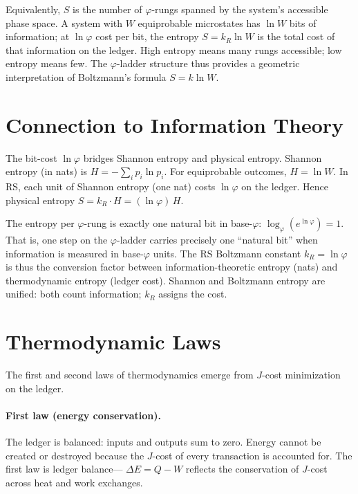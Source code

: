 \documentclass[12pt,a4paper]{article}
\theoremstyle{definition}
\theoremstyle{remark}
\begin{document}
Equivalently, $S$ is the number of $\varphi$-rungs spanned by the
system's accessible phase space.  A system with $W$ equiprobable
microstates has $\ln W$ bits of information; at $\ln\varphi$ cost
per bit, the entropy $S = k_R \ln W$ is the total cost of that
information on the ledger.  High entropy means many rungs
accessible; low entropy means few.  The $\varphi$-ladder structure
thus provides a geometric interpretation of Boltzmann's formula
$S = k \ln W$.

\section{Connection to Information Theory}

The bit-cost $\ln\varphi$ bridges Shannon entropy and physical
entropy.  Shannon entropy (in nats) is
$H = -\sum_i p_i \ln p_i$.  For equiprobable outcomes,
$H = \ln W$.  In RS, each unit of Shannon entropy (one nat) costs
$\ln\varphi$ on the ledger.  Hence physical entropy
$S = k_R \cdot H = (\ln\varphi)\,H$.

The entropy per $\varphi$-rung is exactly one natural bit in
base-$\varphi$: $\log_\varphi(e^{\ln\varphi}) = 1$.  That is, one
step on the $\varphi$-ladder carries precisely one ``natural bit''
when information is measured in base-$\varphi$ units.  The RS
Boltzmann constant $k_R = \ln\varphi$ is thus the conversion factor
between information-theoretic entropy (nats) and thermodynamic
entropy (ledger cost).  Shannon and Boltzmann entropy are unified:
both count information; $k_R$ assigns the cost.

\section{Thermodynamic Laws}

The first and second laws of thermodynamics emerge from
$J$-cost minimization on the ledger.

\paragraph{First law (energy conservation).}
The ledger is balanced: inputs and outputs sum to zero.  Energy
cannot be created or destroyed because the $J$-cost of every
transaction is accounted for.  The first law is ledger balance---
$\Delta E = Q - W$ reflects the conservation of $J$-cost across
heat and work exchanges.
\end{document}
